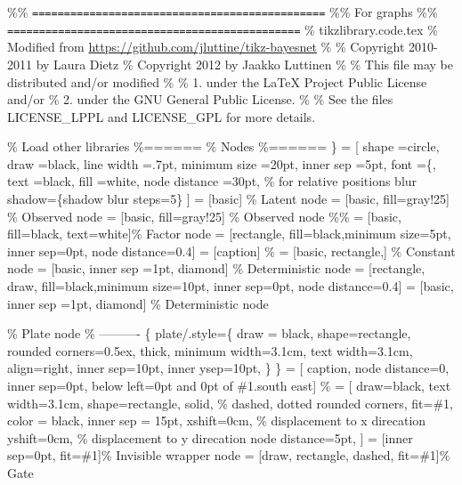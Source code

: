 \documentclass[a4paper]{article}
\begin{document}
\%\% \texttt{==============================================}
\%\% For graphs
\%\% \texttt{==============================================}
\% tikzlibrary.code.tex
\% Modified from \url{https://github.com/jluttine/tikz-bayesnet}
\% 
\% Copyright 2010-2011 by Laura Dietz
\% Copyright 2012 by Jaakko Luttinen
\%
\% This file may be distributed and/or modified
\%
\% 1. under the \LaTeX{} Project Public License and/or
\% 2. under the GNU General Public License.
\%
\% See the files LICENSE\_LPPL and LICENSE\_GPL for more details.

\% Load other libraries
\usetikzlibrary{shapes}
\usetikzlibrary{fit}
\usetikzlibrary{chains}
\usetikzlibrary{arrows}
\usetikzlibrary{petri}
\%======
\% Nodes
\%======
\usetikzlibrary{shadows.blur}
\usetikzlibrary{shapes.symbols}
\newcommand{\DAGnodedistance}{30pt}
\newcommand{\DAGinnersep}{5pt}
\newcommand{\DAGminsize}{20pt}
\newcommand{\DAGfont}\{\fontsize{10}{10}\selectfont\}
\newcommand{\DAGcolorfont}{black}
\newcommand{\DAGcolorborder}{black}
\newcommand{\DAGcolorfill}{white}
\newcommand{\DAGlinewidth}{.7pt}
 = [
    shape         =circle, 
    draw          =\DAGcolorborder,
    line width    =\DAGlinewidth,
    minimum size  =\DAGminsize,
    inner sep     =\DAGinnersep,
    font          =\DAGfont,
    text          =\DAGcolorfont,
    fill          =\DAGcolorfill,
    node distance =\DAGnodedistance,                  \% for relative positions
    blur shadow=\{shadow blur steps=5\}
    ]
            = [basic]                        \% Latent node
           = [basic, fill=gray!25]          \% Observed node
         = [basic, fill=gray!25]          \% Observed node
\%\%          = [basic, fill=black, text=white]\% Factor node
         = [rectangle, fill=black,minimum size=5pt, inner sep=0pt, node distance=0.4]
 = [caption] \%
          = [basic, rectangle,]            \% Constant node
            = [basic, inner sep     =1pt, diamond]               \% Deterministic node
           = [rectangle, draw, fill=black,minimum size=10pt, inner sep=0pt, node distance=0.4]
      = [basic, inner sep     =1pt, diamond]               \% Deterministic node


\% Plate node
\% ---------- 
\tikzset\{
  plate/.style=\{
    draw = black,
    shape=rectangle,
    rounded corners=0.5ex,
    thick,
    minimum width=3.1cm,
    text width=3.1cm,
    align=right,
    inner sep=10pt,
    inner ysep=10pt,
  \}
\}
\newcommand{\DAGplateinnersep}{15pt}
\newcommand{\DAGplatecolorborder}{black}
 = [
  caption,
  node distance=0,
  inner sep=0pt,
  below left=0pt and 0pt of \#1.south east] \%
 = [
  draw=black,
  text width=3.1cm,
  shape=rectangle,
  solid,           \% dashed, dotted
  rounded corners,
  fit=\#1,
  color         = \DAGplatecolorborder,
  inner sep     = \DAGplateinnersep,
  xshift=0cm,   \% displacement to x direcation
  yshift=0cm,   \% displacement to y direcation
  node distance=5pt, 
]
  = [inner sep=0pt, fit=\#1]\% Invisible wrapper node
  = [draw, rectangle, dashed, fit=\#1]\% Gate
\end{document}
